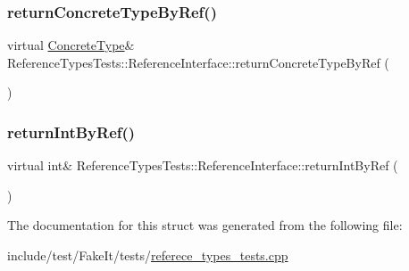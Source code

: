 \mbox{\label{structReferenceTypesTests_1_1ReferenceInterface_a1c65afa6dbf5d542df6f8160b8d2a311}} 
\subsubsection{\texorpdfstring{returnConcreteTypeByRef()}{returnConcreteTypeByRef()}}
{\footnotesize\ttfamily virtual \mbox{\hyperlink{classReferenceTypesTests_1_1ConcreteType}{Concrete\+Type}}\& Reference\+Types\+Tests\+::\+Reference\+Interface\+::return\+Concrete\+Type\+By\+Ref (\begin{DoxyParamCaption}{ }\end{DoxyParamCaption})\hspace{0.3cm}{\ttfamily [pure virtual]}}

\mbox{\label{structReferenceTypesTests_1_1ReferenceInterface_afd8d8c8298ec7506b041140ad0024842}} 
\subsubsection{\texorpdfstring{returnIntByRef()}{returnIntByRef()}}
{\footnotesize\ttfamily virtual int\& Reference\+Types\+Tests\+::\+Reference\+Interface\+::return\+Int\+By\+Ref (\begin{DoxyParamCaption}{ }\end{DoxyParamCaption})\hspace{0.3cm}{\ttfamily [pure virtual]}}



The documentation for this struct was generated from the following file\+:\begin{DoxyCompactItemize}
\item 
include/test/\+Fake\+It/tests/\mbox{\hyperlink{referece__types__tests_8cpp}{referece\+\_\+types\+\_\+tests.\+cpp}}\end{DoxyCompactItemize}
